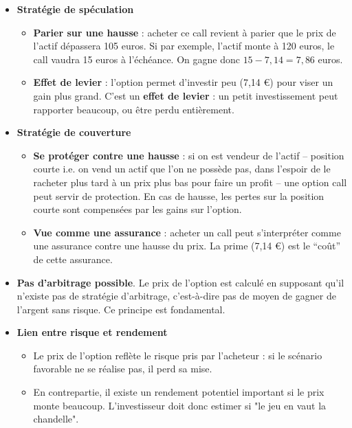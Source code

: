 \documentclass[12pt,a4paper]{article}
\begin{document}
\begin{itemize}

    \item \textbf{Stratégie de spéculation}

    \begin{itemize}
        \item \textbf{Parier sur une hausse} : acheter ce call revient à parier que le prix de l’actif dépassera 105 euros. Si par exemple, l’actif monte à 120 euros, le call vaudra 15 euros à l’échéance. On gagne donc \( 15 - 7{,}14 = 7{,}86 \) euros.
        
        \item \textbf{Effet de levier} : l’option permet d’investir peu (7,14 €) pour viser un gain plus grand. C'est un \textbf{effet de levier} : un petit investissement peut rapporter beaucoup, ou être perdu entièrement.
    \end{itemize}

    \item \textbf{Stratégie de couverture}

    \begin{itemize}
        \item \textbf{Se protéger contre une hausse} : si on est vendeur de l’actif -- position courte i.e. on vend un actif que l’on ne possède pas, dans l’espoir de le racheter plus tard à un prix plus bas pour faire un profit -- une option call peut servir de protection. En cas de hausse, les pertes sur la position courte sont compensées par les gains sur l’option.
        
        \item \textbf{Vue comme une assurance} : acheter un call peut s’interpréter comme une assurance contre une hausse du prix. La prime (7,14 €) est le “coût” de cette assurance.
    \end{itemize}

    \item \textbf{Pas d’arbitrage possible}. Le prix de l’option est calculé en supposant qu’il n’existe pas de stratégie d’arbitrage, c’est-à-dire pas de moyen de gagner de l’argent sans risque. Ce principe est fondamental.

    \item \textbf{Lien entre risque et rendement}

    \begin{itemize}
        \item Le prix de l’option reflète le risque pris par l’acheteur : si le scénario favorable ne se réalise pas, il perd sa mise.
        
        \item En contrepartie, il existe un rendement potentiel important si le prix monte beaucoup. L’investisseur doit donc estimer si "le jeu en vaut la chandelle".
    \end{itemize}
\end{itemize}
\end{document}
